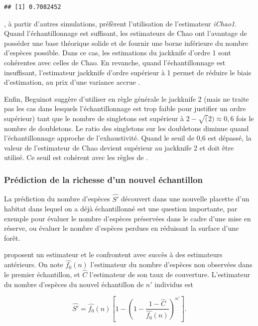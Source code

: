 \documentclass[
  11pt,
  american,
  a4paper,
  extrafontsizes,onecolumn,openright
  ]{memoir}
\newlength{\rf}
\begin{document}
\begin{verbatim}
## [1] 0.7082452
\end{verbatim}

\normalsize

\textcite{Chiu2014a}, à partir d'autres simulations, préfèrent l'utilisation de l'estimateur \emph{iChao1}.
Quand l'échantillonnage est suffisant, les estimateurs de Chao ont l'avantage de posséder une base théorique solide et de fournir une borne inférieure du nombre d'espèces possible.
Dans ce cas, les estimations du jackknife d'ordre 1 sont cohérentes avec celles de Chao.
En revanche, quand l'échantillonnage est insuffisant, l'estimateur jackknife d'ordre supérieur à 1 permet de réduire le biais d'estimation, au prix d'une variance accrue \autocite{Marcon2015a}.

Enfin, Beguinot \autocite*{Beguinot2015a,Beguinot2016} suggère d'utiliser en règle générale le jackknife 2 (mais ne traite pas les cas dans lesquels l'échantillonnage est trop faible pour justifier un ordre supérieur) tant que le nombre de singletons est supérieur à \(2-\sqrt(2) \approx 0,6\) fois le nombre de doubletons.
Le ratio des singletons sur les doubletons diminue quand l'échantillonnage approche de l'exhaustivité.
Quand le seuil de 0,6 est dépassé, la valeur de l'estimateur de Chao devient supérieur au jackknife 2 et doit être utilisé.
Ce seuil est cohérent avec les règles de \textcite{Brose2003}.

\subsubsection{Prédiction de la richesse d'un nouvel échantillon}\label{sec-Extrapol}

La prédiction du nombre d'espèces \(\hat{S'}\) découvert dans une nouvelle placette d'un habitat dans lequel on a déjà échantillonné est une question importante, par exemple pour évaluer le nombre d'espèces préservées dans le cadre d'une mise en réserve, ou évaluer le nombre d'espèces perdues en réduisant la surface d'une forêt.

\textcite{Shen2003} proposent un estimateur et le confrontent avec succès à des estimateurs antérieurs.
On note \(\hat{f_0}(n)\) l'estimateur du nombre d'espèces non observées dans le premier échantillon, et \(\hat{C}\) l'estimateur de son taux de couverture.
L'estimateur du nombre d'espèces du nouvel échantillon de \(n'\) individus est

\begin{equation}
  \hat{S'} 
  = \hat{f_0}(n) \left[ 
    1 - {\left( 1 - \frac{1 - \hat{C}}{\hat{f_0}(n)} \right)}^{n'} 
  \right].
\end{equation}
\end{document}
